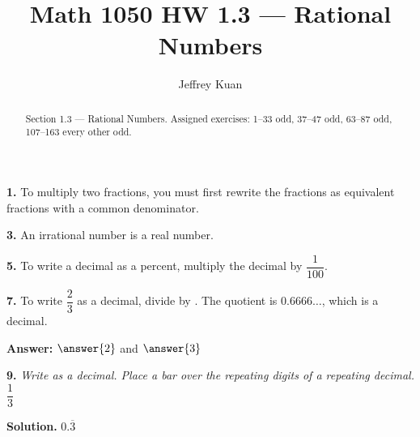 \documentclass{ximera}
\author{Jeffrey Kuan}
\title{Math 1050 HW 1.3 --- Rational Numbers}
\begin{document}
\begin{abstract}
    Section 1.3 --- Rational Numbers.
    Assigned exercises: 1–33 odd, 37–47 odd, 63–87 odd, 107–163 every other odd.
\end{abstract}

\maketitle

\begin{problem}
\textbf{1.} To multiply two fractions, you must first rewrite the fractions as equivalent
  fractions with a common denominator.

\begin{multipleChoice}
\end{multipleChoice}
\end{problem}

\begin{problem}
\textbf{3.} An irrational number is a real number.

\begin{multipleChoice}
\end{multipleChoice}
\end{problem}

\begin{problem}
\textbf{5.} To write a decimal as a percent, multiply the decimal by $\dfrac{1}{100}$.

\begin{multipleChoice}
\end{multipleChoice}
\end{problem}

\begin{problem}
\textbf{7.} To write $\dfrac{2}{3}$ as a decimal, divide \blank{} by \blank. The quotient is
  $0.6666\ldots$, which is a \blank{} decimal.

\textbf{Answer:} $\answer{2}$ and $\answer{3}$
\end{problem}

\begin{problem}
\textbf{9.} \emph{Write as a decimal. Place a bar over the repeating digits of a repeating decimal.}\quad $\dfrac{1}{3}$

\begin{hint}
\textbf{Solution.} $0.\overline{3}$
\end{hint}
\end{problem}
\end{document}
